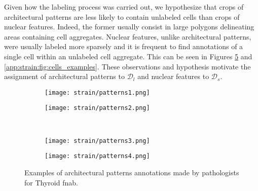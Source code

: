 Given how the labeling process was carried out, we hypothesize that crops of architectural patterns are less likely to contain unlabeled cells than crops of nuclear features. Indeed, the former usually consist in large polygons delineating areas containing cell aggregates. Nuclear features, unlike architectural patterns, were usually labeled more sparsely and it is frequent to find annotations of a single cell within an unlabeled cell aggregate. This can be seen in Figures \ref{app:strain:fig:patterns_examples} and \ref{app:strain:fig:cells_examples}. These observations and hypothesis motivate the assignment of architectural patterns to $\mathcal{D}_l$ and nuclear features to $\mathcal{D}_s$.

\begin{figure}
    \centering
    \begin{subfigure}{.48\textwidth}
      \centering
      \texttt{[image: strain/patterns1.png]}
      \caption{}
      \label{app:strain:sfig:pattern1}
    \end{subfigure}
    \begin{subfigure}{.48\textwidth}
      \centering
      \texttt{[image: strain/patterns2.png]}
      \caption{}
      \label{app:strain:sfig:pattern2}
    \end{subfigure} \\
    \begin{subfigure}{.48\textwidth}
      \centering
      \texttt{[image: strain/patterns3.png]}
      \caption{}
      \label{app:strain:sfig:pattern3}
    \end{subfigure}
    \begin{subfigure}{.48\textwidth}
      \centering
      \texttt{[image: strain/patterns4.png]}
      \caption{}
      \label{app:strain:sfig:pattern4}
    \end{subfigure}
    \caption{Examples of architectural patterns annotations made by pathologists for Thyroid \acrshort{fnab}.}
    \label{app:strain:fig:patterns_examples}
\end{figure}


